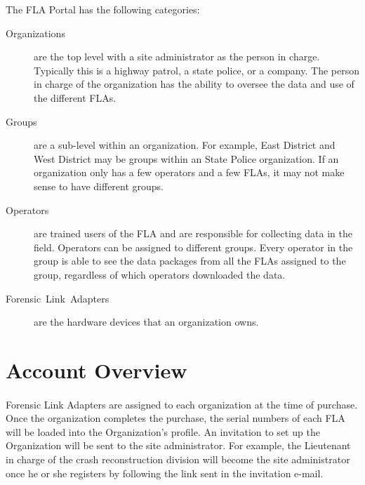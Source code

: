 \documentclass[11pt, oneside]{book}
\begin{document}
The FLA Portal has the following categories:
\begin{description}
\item [{Organizations}] are the top level with a site administrator as
the person in charge. Typically this is a highway patrol, a state
police, or a company. The person in charge of the organization has
the ability to oversee the data and use of the different FLAs.
\item [{Groups}] are a sub-level within an organization. For example, East
District and West District may be groups within an State Police organization.
If an organization only has a few operators and a few FLAs, it may
not make sense to have different groups. 
\item [{Operators}] are trained users of the FLA and are responsible for
collecting data in the field. Operators can be assigned to different
groups. Every operator in the group is able to see the data packages
from all the FLAs assigned to the group, regardless of which operators
downloaded the data.
\item [{Forensic~Link~Adapters}] are the hardware devices that an organization
owns.
\end{description}

\section{Account Overview}
\paragraph{  }
Forensic Link Adapters are assigned to each organization at the time
of purchase. Once the organization completes the purchase, the serial
numbers of each FLA will be loaded into the Organization's profile.
An invitation to set up the Organization will be sent to the site
administrator. For example, the Lieutenant in charge of the crash
reconstruction division will become the site administrator once he
or she registers by following the link sent in the invitation e-mail.
\end{document}
